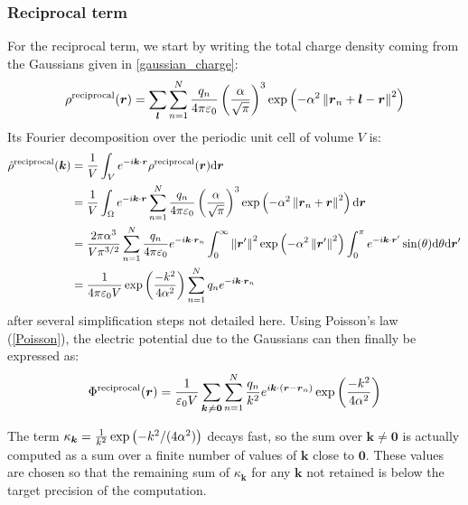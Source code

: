 \documentclass[main.tex]{subfiles}
\begin{document}
\subsubsection{Reciprocal term}

For the reciprocal term, we start by writing the total charge density coming from the Gaussians given in \cref{gaussian_charge}:
\[\rho^\text{reciprocal}(\boldsymbol r) = \sum_{\boldsymbol l}\sum_{n=1}^N \frac{q_n}{4\pi\varepsilon_0}\left(\frac\alpha{\sqrt\pi}\right)^3\exp\left(-\alpha^2\left\|\boldsymbol r_n + \boldsymbol l - \boldsymbol r\right\|^2\right)\]
Its Fourier decomposition over the periodic unit cell of volume $V$ is:
\[\begin{split}
\hat\rho^\text{reciprocal}(\boldsymbol k) &= \frac1V\int_V e^{-i\boldsymbol k\cdot\boldsymbol r} \rho^\text{reciprocal}(\boldsymbol r)\text d\boldsymbol r
\\&= \frac1V\int_\Omega e^{-i\boldsymbol k\cdot\boldsymbol r} \sum_{n=1}^N \frac{q_n}{4\pi\varepsilon_0} \left(\frac\alpha{\sqrt\pi}\right)^3\exp\left(-\alpha^2\left\|\boldsymbol r_n + \boldsymbol r\right\|^2\right) \text d\boldsymbol r
\\&= \frac{2\pi\alpha^3}{V\pi^{3/2}} \sum_{n=1}^N \frac{q_n}{4\pi\varepsilon_0} e^{-i\boldsymbol k\cdot\boldsymbol r_n} \int_0^\infty \left\|\boldsymbol{r}'\right\|^2\exp\left(-\alpha^2 \left\|\boldsymbol{r}'\right\|^2\right)\int_0^\pi e^{-i\boldsymbol k\cdot\boldsymbol{r}'} \sin(\theta) \text d \theta \text d \boldsymbol{r}'
\\&= \frac1{4\pi\varepsilon_0V}\exp\left(\frac{-k^2}{4\alpha^2}\right)\sum_{n=1}^N q_n e^{-i\boldsymbol k\cdot\boldsymbol r_n}\end{split}\]
after several simplification steps not detailed here. Using Poisson's law (\cref{Poisson}), the electric potential due to the Gaussians can then finally be expressed as:
\[\Phi^\text{reciprocal}(\boldsymbol r) = \frac{1}{\varepsilon_0V}\sum_{\boldsymbol k\not\kern0.2ex= \boldsymbol 0}\sum_{n=1}^N \frac{q_n}{k^2} e^{i\boldsymbol k\cdot\left(\boldsymbol r - \boldsymbol r_n\right)}\exp\left(\frac{-k^2}{4\alpha^2}\right)\label{eq:reciprocal}\]

The term $\kappa_{\boldsymbol{k}} = \frac1{k^2}\exp\left(-k^2/(4\alpha^2)\right)$ decays fast, so the sum over $\boldsymbol{k}\neq\boldsymbol{0}$ is actually computed as a sum over a finite number of values of $\boldsymbol{k}$ close to $\boldsymbol{0}$. These values are chosen so that the remaining sum of $\kappa_{\boldsymbol{k}}$ for any $\boldsymbol{k}$ not retained is below the target precision of the computation.
\end{document}
